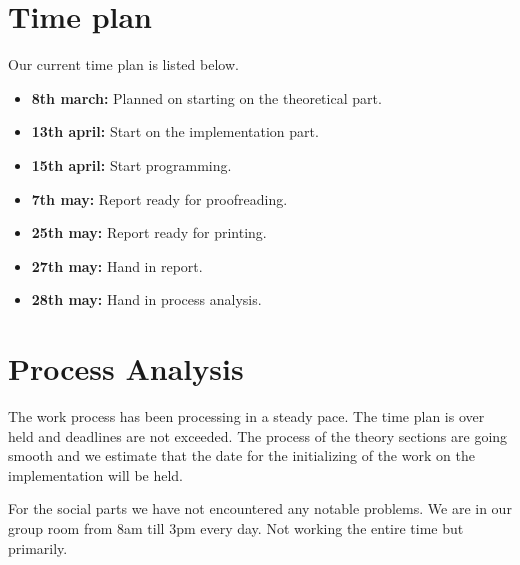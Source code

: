 \documentclass{article}
\begin{document}
\section{Time plan}
Our current time plan is listed below. 
\begin{itemize}
	\item \textbf{8th march:} Planned on starting on the theoretical part.
	\item \textbf{13th april:} Start on the implementation part.
	\item \textbf{15th april:} Start programming. 
	\item \textbf{7th may:} Report ready for proofreading.
	\item \textbf{25th may:} Report ready for printing.
	\item \textbf{27th may:} Hand in report.
	\item \textbf{28th may:} Hand in process analysis.
\end{itemize}


\section{Process Analysis}
The work process has been processing in a steady pace. The time plan is over held and deadlines are not exceeded. The process of the theory sections are going smooth and we estimate that the date for the initializing of the work on the implementation will be held. 

For the social parts we have not encountered any notable problems. We are in our group room from 8am till 3pm every day. Not working the entire time but primarily. 


\end{document}
